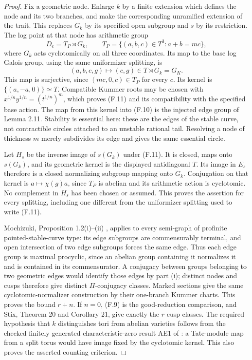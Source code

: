 \begin{proof}
Fix a geometric node. Enlarge $k$ by a finite extension which
defines the node and its two branches, and make the corresponding
unramified extension of the trait. This replaces $G_k$ by its
specified open subgroup and $s$ by its restriction. The log point
at that node has arithmetic group
\[
 D_e=T_P\rtimes G_k,\qquad
 T_P=\{(a,b,c)\in T^3:a+b=mc\},
\]
where $G_k$ acts cyclotomically on all three coordinates. Its map
to the base log Galois group, using the same uniformizer splitting,
is
\[
 (a,b,c,g)\longmapsto(c,g)\in T\rtimes G_k=G_K.                \tag{F.11}
\]
This map is surjective, since $(mc,0,c)\in T_P$ for every $c$.
Its kernel is $\{(a,-a,0)\}\simeq T$. Compatible Kummer roots
may be chosen with $x^{1/n}y^{1/n}=(t^{1/n})^m$, which proves
(F.11) and its compatibility with the specified base action.
The map from this kernel into (F.10) is the injected edge group of
Lemma 2.11. Stability is essential here: these are the edges of
the stable curve, not contractible circles attached to an unstable
rational tail. Resolving a node of thickness $m$ merely subdivides
its edge and gives the same essential circle.

Let $H_s$ be the inverse image of $s(G_k)$ under (F.11).
It is closed, maps onto $s(G_k)$, and its geometric kernel is the
displayed antidiagonal $T$. Its image in $E_s$ therefore is a
closed normalizing subgroup mapping onto $G_k$. Conjugation on
that kernel is $a\mapsto\chi(g)a$, since $T_P$ is abelian and
its arithmetic action is cyclotomic. No complement in $H_s$ has
been chosen or assumed. This proves the assertion for every
splitting, including one different from the uniformizer splitting
used to write (F.11).

Mochizuki, Proposition 1.2(i)--(ii)
\cite{CF_MochizukiComb2007}, applies to every semi-graph of
profinite pointed-stable-curve type: its edge subgroups are
commensurably terminal, and open intersection of two edge
subgroups forces the same edge. Thus each edge group is maximal
procyclic, since an abelian group containing it normalizes it and
is contained in its commensurator. A conjugacy between groups
belonging to two geometric edges would identify those edges by
part (i); distinct nodes and cusps therefore give distinct
$\Pi$-conjugacy classes. Marked sections give the same
cyclotomic-normalizer construction by their one-branch Kummer
charts. This proves the bound $r+n$. If $n=0$, (F.9) is the
good-reduction comparison, and Stix, Theorem 20 and Corollary 21,
give exactly the $r$ cusp classes. The required hypothesis that
$k$ distinguishes tori from abelian varieties follows from the
checked finitely generated characteristic-zero result AE1 of
\cite{PriorCyclotomic}: a Tate-module map from a split torus
would have image fixed by the cyclotomic kernel. This also proves
the asserted counting criterion.


\end{proof}
